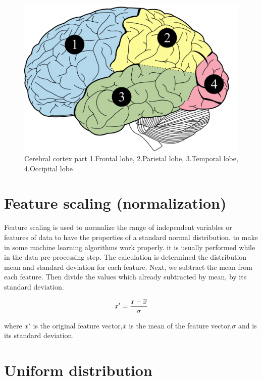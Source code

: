 \begin{figure}[ht]
	\centering
	\includegraphics[scale = 0.32]{chapter3/33.pdf}
	\caption{Cerebral cortex part 1.Frontal lobe, 2.Parietal lobe, 3.Temporal lobe, 4.Occipital lobe}
\end{figure}

\newpage
\section{Feature scaling (normalization)}

\hspace{1.5cm} Feature scaling is used to normalize the range of independent variables or features of data to have the properties of a standard normal distribution. to make in some machine learning algorithms work properly. it is usually performed while in the data pre-processing step. The calculation is determined the distribution mean and standard deviation for each feature. Next, we subtract the mean from each feature. Then divide the values which already subtracted by mean, by its standard deviation.\cite{ref10}

\begin{equation}\label{1}
	x' = {x-{\overline{x}} \over {\sigma}}
\end{equation}

where $x'$ is the original feature vector,$\overline{x}$ is the mean of the feature vector,$\sigma$ and is its standard deviation.

\section{Uniform distribution\cite{ref11}}

